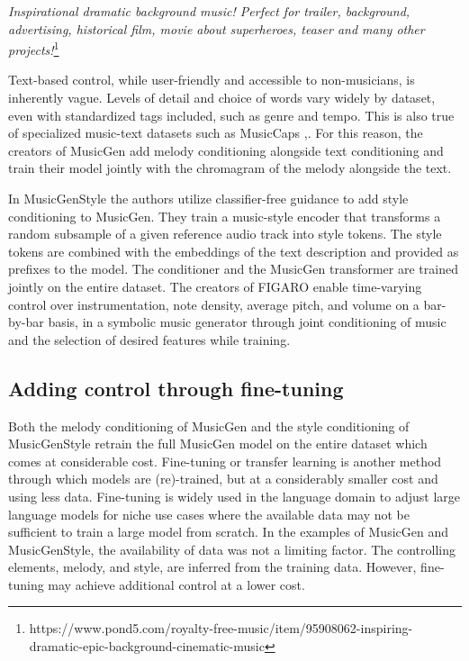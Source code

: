 \textit{Inspirational dramatic background music! Perfect for trailer, background, advertising, historical film, movie about superheroes, teaser and many other projects!}\footnote{ https://www.pond5.com/royalty-free-music/item/95908062-inspiring-dramatic-epic-background-cinematic-music
}

Text-based control, while user-friendly and accessible to non-musicians, is inherently vague. Levels of detail and choice of words vary widely by dataset, even with standardized tags included, such as genre and tempo. This is also true of specialized music-text datasets such as MusicCaps \cite{Agostinelli_Denk_Borsos_Engel_Verzetti_Caillon_Huang_Jansen_Roberts_Tagliasacchi_et_al._2023},\cite{Lee_Doh_Jeong_2023_subjectivity_musiccaps}. For this reason, the creators of MusicGen \cite{copet2023simple} add melody conditioning alongside text conditioning and train their model jointly with the chromagram of the melody alongside the text. 

In MusicGenStyle \cite{Rouard_Adi_Copet_Roebel_Défossez_musicgenstyle_2024} the authors utilize classifier-free guidance to add style conditioning to MusicGen. They train a music-style encoder that transforms a random subsample of a given reference audio track into style tokens. The style tokens are combined with the embeddings of the text description and provided as prefixes to the model. The conditioner and the MusicGen transformer are trained jointly on the entire dataset. 
The creators of FIGARO \cite{Rütte_figaro_2023} enable time-varying control over instrumentation, note density, average pitch, and volume on a bar-by-bar basis, in a symbolic music generator through joint conditioning  of music and the selection of desired features while training. 
\subsection{Adding control through fine-tuning}

Both the melody conditioning of MusicGen \cite{copet2023simple} and the style conditioning of MusicGenStyle \cite{Rouard_Adi_Copet_Roebel_Défossez_musicgenstyle_2024} retrain the full MusicGen model on the entire dataset which comes at considerable cost. Fine-tuning or transfer learning is another method through which models are (re)-trained, but at a considerably smaller cost and using less data. Fine-tuning is widely used in the language domain to adjust large language models for niche use cases where the available data may not be sufficient to train a large model from scratch. In the examples of MusicGen and MusicGenStyle, the availability of data was not a limiting factor. The controlling elements, melody, and style, are inferred from the training data. However, fine-tuning may achieve additional control at a lower cost. 

